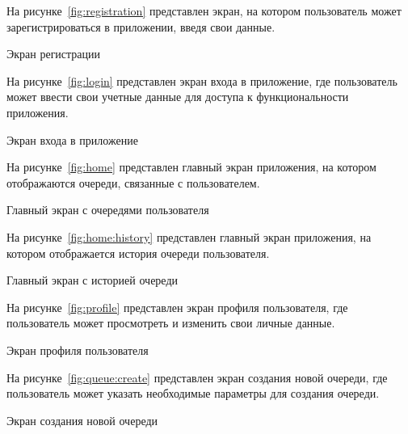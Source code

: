 На рисунке~\ref{fig:registration} представлен экран,
на котором пользователь может зарегистрироваться в приложении,
введя свои данные.

\begin{image}
    \caption{Экран регистрации}
    \label{fig:registration}
\end{image}

\clearpage

На рисунке~\ref{fig:login} представлен экран входа в приложение,
где пользователь может ввести свои учетные данные для доступа
к функциональности приложения.

\begin{image}
    \caption{Экран входа в приложение}
    \label{fig:login}
\end{image}

На рисунке~\ref{fig:home} представлен главный экран приложения,
на котором отображаются очереди, связанные с пользователем.

\begin{image}
    \caption{Главный экран с очередями пользователя}
    \label{fig:home}
\end{image}

\clearpage

На рисунке~\ref{fig:home:history} представлен главный экран приложения,
на котором отображается история очереди пользователя.

\begin{image}
    \caption{Главный экран с историей очереди}
    \label{fig:home:history}
\end{image}

На рисунке~\ref{fig:profile} представлен экран профиля пользователя,
где пользователь может просмотреть и изменить свои личные данные.

\begin{image}
    \caption{Экран профиля пользователя}
    \label{fig:profile}
\end{image}

На рисунке~\ref{fig:queue:create} представлен экран создания новой очереди,
где пользователь может указать необходимые параметры для создания очереди.

\begin{image}
    \caption{Экран создания новой очереди}
    \label{fig:queue:create}
\end{image}

